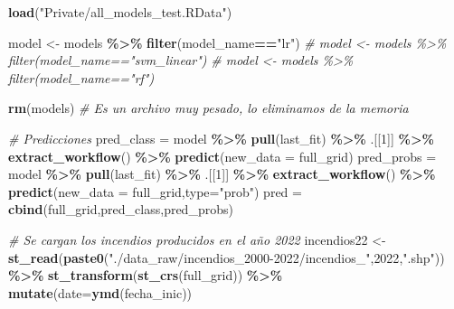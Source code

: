 \documentclass[12pt,a4paper,]{book}
\newenvironment{Shaded}{\begin{snugshade}}{\end{snugshade}}
\newcommand{\AttributeTok}[1]{\textcolor[rgb]{0.13,0.29,0.53}{#1}}
\newcommand{\CommentTok}[1]{\textcolor[rgb]{0.56,0.35,0.01}{\textit{#1}}}
\newcommand{\DecValTok}[1]{\textcolor[rgb]{0.00,0.00,0.81}{#1}}
\newcommand{\FunctionTok}[1]{\textcolor[rgb]{0.13,0.29,0.53}{\textbf{#1}}}
\newcommand{\NormalTok}[1]{#1}
\newcommand{\OtherTok}[1]{\textcolor[rgb]{0.56,0.35,0.01}{#1}}
\newcommand{\SpecialCharTok}[1]{\textcolor[rgb]{0.81,0.36,0.00}{\textbf{#1}}}
\newcommand{\StringTok}[1]{\textcolor[rgb]{0.31,0.60,0.02}{#1}}
\numberwithin{dummy}{section}
\theoremstyle{ocrenumbox}
\theoremstyle{blacknumex}
\theoremstyle{blacknumbox}
\theoremstyle{ocrenum}
\theoremstyle{ocrenum}
\begin{document}
\begin{Shaded}
\begin{Highlighting}[]
\FunctionTok{load}\NormalTok{(}\StringTok{"Private/all\_models\_test.RData"}\NormalTok{)}

\NormalTok{model }\OtherTok{\textless{}{-}}\NormalTok{ models }\SpecialCharTok{\%\textgreater{}\%} \FunctionTok{filter}\NormalTok{(model\_name}\SpecialCharTok{==}\StringTok{"lr"}\NormalTok{)}
\CommentTok{\# model \textless{}{-} models \%\textgreater{}\% filter(model\_name=="svm\_linear")}
\CommentTok{\# model \textless{}{-} models \%\textgreater{}\% filter(model\_name=="rf")}

\FunctionTok{rm}\NormalTok{(models) }\CommentTok{\# Es un archivo muy pesado, lo eliminamos de la memoria}

\CommentTok{\# Predicciones}
\NormalTok{pred\_class }\OtherTok{=}\NormalTok{ model }\SpecialCharTok{\%\textgreater{}\%} 
  \FunctionTok{pull}\NormalTok{(last\_fit) }\SpecialCharTok{\%\textgreater{}\%} 
\NormalTok{  .[[}\DecValTok{1}\NormalTok{]] }\SpecialCharTok{\%\textgreater{}\%} 
  \FunctionTok{extract\_workflow}\NormalTok{() }\SpecialCharTok{\%\textgreater{}\%} 
  \FunctionTok{predict}\NormalTok{(}\AttributeTok{new\_data =}\NormalTok{ full\_grid)}
\NormalTok{pred\_probs }\OtherTok{=}\NormalTok{ model }\SpecialCharTok{\%\textgreater{}\%} 
  \FunctionTok{pull}\NormalTok{(last\_fit) }\SpecialCharTok{\%\textgreater{}\%} 
\NormalTok{  .[[}\DecValTok{1}\NormalTok{]] }\SpecialCharTok{\%\textgreater{}\%} 
  \FunctionTok{extract\_workflow}\NormalTok{() }\SpecialCharTok{\%\textgreater{}\%} 
  \FunctionTok{predict}\NormalTok{(}\AttributeTok{new\_data =}\NormalTok{ full\_grid,}\AttributeTok{type=}\StringTok{"prob"}\NormalTok{)}
\NormalTok{pred }\OtherTok{=} \FunctionTok{cbind}\NormalTok{(full\_grid,pred\_class,pred\_probs)}

\CommentTok{\# Se cargan los incendios producidos en el año 2022}
\NormalTok{incendios22 }\OtherTok{\textless{}{-}} \FunctionTok{st\_read}\NormalTok{(}\FunctionTok{paste0}\NormalTok{(}\StringTok{"./data\_raw/incendios\_2000{-}2022/incendios\_"}\NormalTok{,}\DecValTok{2022}\NormalTok{,}\StringTok{".shp"}\NormalTok{)) }\SpecialCharTok{\%\textgreater{}\%} 
  \FunctionTok{st\_transform}\NormalTok{(}\FunctionTok{st\_crs}\NormalTok{(full\_grid)) }\SpecialCharTok{\%\textgreater{}\%} 
  \FunctionTok{mutate}\NormalTok{(}\AttributeTok{date=}\FunctionTok{ymd}\NormalTok{(fecha\_inic))}
\end{Highlighting}
\end{Shaded}
\end{document}
